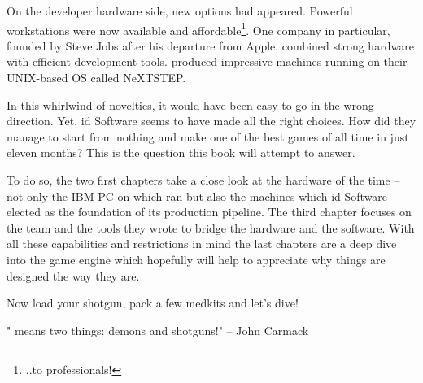  \par
 On the developer hardware side, new options had appeared. Powerful workstations were now available and affordable\footnote{..to professionals!}. One company in particular, founded by Steve Jobs after his departure from Apple, combined strong hardware with efficient development tools. \NeXT produced impressive machines running on their UNIX-based OS called NeXTSTEP.\\%
 \par
 In this whirlwind of novelties, it would have been easy to go in the wrong direction. Yet, id Software seems to have made all the right choices. How did they manage to start from nothing and make one of the best games of all time in just eleven months? This is the question this book will attempt to answer.\\
 \par
 To do so, the two first chapters take a close look at the hardware of the time -- not only the IBM PC on which \doom{} ran but also the \NeXT machines which id Software elected as the foundation of its production pipeline. The third chapter focuses on the team and the tools they wrote to bridge the hardware and the software. With all these capabilities and restrictions in mind the last chapters are a deep dive into the game engine which hopefully will help to appreciate why things are designed the way they are.\\
\par
Now load your shotgun, pack a few medkits and let's dive!\\
\par
\centering "\doom{} means two things: demons and shotguns!" -- John Carmack

